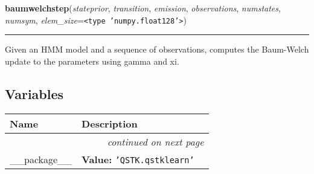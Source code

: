    \vspace{0.5ex}

\hspace{.8\funcindent}\begin{boxedminipage}{\funcwidth}

    \raggedright \textbf{baumwelchstep}(\textit{stateprior}, \textit{transition}, \textit{emission}, \textit{observations}, \textit{numstates}, \textit{numsym}, \textit{elem\_size}={\tt {\textless}type 'numpy.float128'{\textgreater}})

    \vspace{-1.5ex}

    \rule{\textwidth}{0.5\fboxrule}
\setlength{\parskip}{2ex}
    Given an HMM model and a sequence of observations, computes the 
    Baum-Welch update to the parameters using gamma and xi.

\setlength{\parskip}{1ex}
    \end{boxedminipage}



  \subsection{Variables}

    \vspace{-1cm}
\hspace{\varindent}\begin{longtable}{|p{\varnamewidth}|p{\vardescrwidth}|l}
\cline{1-2}
\cline{1-2} \centering \textbf{Name} & \centering \textbf{Description}& \\
\cline{1-2}
\endhead\cline{1-2}\multicolumn{3}{r}{\small\textit{continued on next page}}\\\endfoot\cline{1-2}
\endlastfoot\raggedright \_\-\_\-p\-a\-c\-k\-a\-g\-e\-\_\-\_\- & \raggedright \textbf{Value:} 
{\tt \texttt{'}\texttt{QSTK.qstklearn}\texttt{'}}&\\
\cline{1-2}
\end{longtable}



